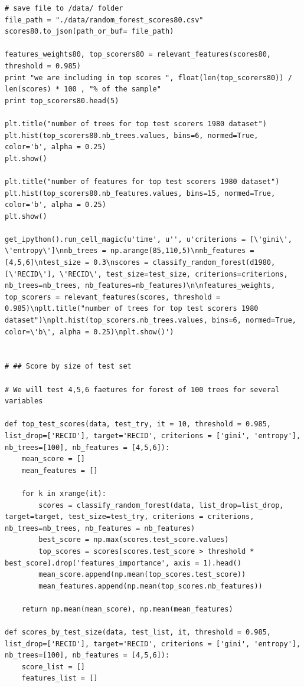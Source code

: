 \documentclass[a4paper]{article}
\theoremstyle{plain}
\begin{document}
\begin{lstlisting}
# save file to /data/ folder
file_path = "./data/random_forest_scores80.csv"
scores80.to_json(path_or_buf= file_path)

features_weights80, top_scorers80 = relevant_features(scores80, threshold = 0.985)
print "we are including in top scores ", float(len(top_scorers80)) / len(scores) * 100 , "% of the sample"
print top_scorers80.head(5)

plt.title("number of trees for top test scorers 1980 dataset")
plt.hist(top_scorers80.nb_trees.values, bins=6, normed=True, color='b', alpha = 0.25)
plt.show()

plt.title("number of features for top test scorers 1980 dataset")
plt.hist(top_scorers80.nb_features.values, bins=15, normed=True, color='b', alpha = 0.25)
plt.show()

get_ipython().run_cell_magic(u'time', u'', u'criterions = [\'gini\', \'entropy\']\nnb_trees = np.arange(85,110,5)\nnb_features = [4,5,6]\ntest_size = 0.3\nscores = classify_random_forest(d1980, [\'RECID\'], \'RECID\', test_size=test_size, criterions=criterions, nb_trees=nb_trees, nb_features=nb_features)\n\nfeatures_weights, top_scorers = relevant_features(scores, threshold = 0.985)\nplt.title("number of trees for top test scorers 1980 dataset")\nplt.hist(top_scorers.nb_trees.values, bins=6, normed=True, color=\'b\', alpha = 0.25)\nplt.show()')


# ## Score by size of test set

# We will test 4,5,6 faetures for forest of 100 trees for several variables

def top_test_scores(data, test_try, it = 10, threshold = 0.985, list_drop=['RECID'], target='RECID', criterions = ['gini', 'entropy'], nb_trees=[100], nb_features = [4,5,6]):
    mean_score = []
    mean_features = []
    
    for k in xrange(it):
        scores = classify_random_forest(data, list_drop=list_drop, target=target, test_size=test_try, criterions = criterions, nb_trees=nb_trees, nb_features = nb_features)
        best_score = np.max(scores.test_score.values)
        top_scores = scores[scores.test_score > threshold * best_score].drop('features_importance', axis = 1).head()
        mean_score.append(np.mean(top_scores.test_score))
        mean_features.append(np.mean(top_scores.nb_features))
    
    return np.mean(mean_score), np.mean(mean_features)

def scores_by_test_size(data, test_list, it, threshold = 0.985, list_drop=['RECID'], target='RECID', criterions = ['gini', 'entropy'], nb_trees=[100], nb_features = [4,5,6]):
    score_list = []
    features_list = []
    

\end{lstlisting}
\end{document}

